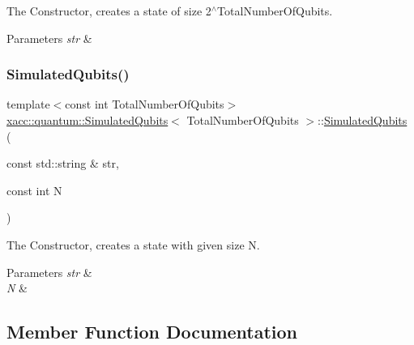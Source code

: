 The Constructor, creates a state of size 2$^\wedge$\+Total\+Number\+Of\+Qubits.


\begin{DoxyParams}{Parameters}
{\em str} & \\
\hline
\end{DoxyParams}
\mbox{\label{a01248_a3d0f465d821565c582c37b6b4d7e4f79}} 
\subsubsection{\texorpdfstring{Simulated\+Qubits()}{SimulatedQubits()}\hspace{0.1cm}{\footnotesize\ttfamily [2/2]}}
{\footnotesize\ttfamily template$<$const int Total\+Number\+Of\+Qubits$>$ \\
\hyperlink{a01248}{xacc\+::quantum\+::\+Simulated\+Qubits}$<$ Total\+Number\+Of\+Qubits $>$\+::\hyperlink{a01248}{Simulated\+Qubits} (\begin{DoxyParamCaption}\item[{const std\+::string \&}]{str,  }\item[{const int}]{N }\end{DoxyParamCaption})\hspace{0.3cm}{\ttfamily [inline]}}

The Constructor, creates a state with given size N. 
\begin{DoxyParams}{Parameters}
{\em str} & \\
\hline
{\em N} & \\
\hline
\end{DoxyParams}


\subsection{Member Function Documentation}
\mbox{\label{a01248_a97ecaaf5aab14bc017726fe9cfd41c46}} 

